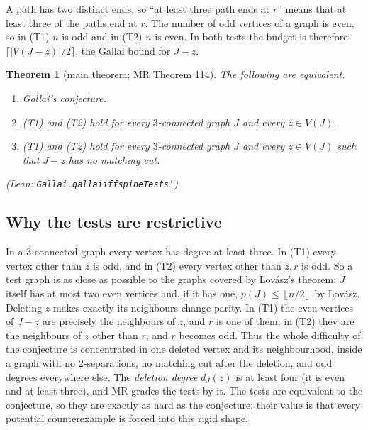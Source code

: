 \documentclass[11pt]{amsart}
\newtheorem{theorem}{Theorem}[section]
\theoremstyle{definition}
\theoremstyle{remark}
\renewcommand{\_}{\oldunderscore\allowbreak}
\newcommand{\leanst}[1]{\par{\raggedright\small\textup{(Lean: \texttt{#1})}\par}}
\newcommand{\fl}[1]{\left\lfloor #1\right\rfloor}
\begin{document}
A path has two distinct ends, so ``at least three path ends at $r$'' means that at least three of
the paths end at $r$. The number of odd vertices of a graph is even, so in (T1) $n$ is odd and in
(T2) $n$ is even. In both tests the budget is therefore $\lceil |V(J-z)|/2\rceil$, the Gallai bound
for $J-z$.

\begin{theorem}[main theorem; MR Theorem 114]\label{thm:main}
The following are equivalent.
\begin{enumerate}[label=\textup{(\roman*)}]
\item Gallai's conjecture.
\item \textup{(T1)} and \textup{(T2)} hold for every $3$-connected graph $J$ and every
$z\in V(J)$.
\item \textup{(T1)} and \textup{(T2)} hold for every $3$-connected graph $J$ and every
$z\in V(J)$ such that $J-z$ has no matching cut.
\end{enumerate}
\leanst{Gallai.gallai\_iff\_spineTests'}
\end{theorem}

\subsection*{Why the tests are restrictive}
In a $3$-connected graph every vertex has degree at least three. In (T1) every vertex other than $z$
is odd, and in (T2) every vertex other than $z,r$ is odd. So a test graph is as close as possible to
the graphs covered by Lov\'asz's theorem: $J$ itself has at most two even vertices and, if it has
one, $p(J)\le\fl{n/2}$ by Lov\'asz. Deleting $z$ makes exactly its neighbours change parity. In
(T1) the even vertices of $J-z$ are precisely the neighbours of $z$, and $r$ is one of them; in (T2)
they are the neighbours of $z$ other than $r$, and $r$ becomes odd. Thus the whole difficulty of the
conjecture is concentrated in one deleted vertex and its neighbourhood, inside a graph with no
$2$-separations, no matching cut after the deletion, and odd degrees everywhere else. The
\emph{deletion degree} $d_J(z)$ is at least four (it is even and at least three), and MR grades the
tests by it. The tests are equivalent to the conjecture, so they are exactly as hard as the
conjecture; their value is that every potential counterexample is forced into this rigid shape.
\end{document}
